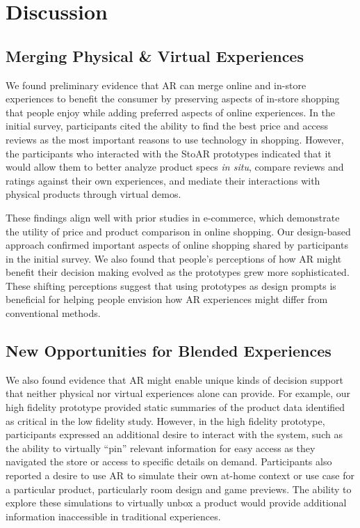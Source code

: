 \section{Discussion}

\subsection{Merging Physical \& Virtual Experiences}
We found preliminary evidence that AR can merge online and in-store experiences to benefit the consumer by preserving aspects of in-store shopping that people enjoy while adding preferred aspects of online experiences.  In the initial survey, participants cited the ability to find the best price and access reviews as the most important reasons to use technology in shopping. However, the participants who interacted with the StoAR prototypes indicated that it would allow them to better analyze product specs \emph{in situ}, compare reviews and ratings against their own experiences, and mediate their interactions with physical products through virtual demos.

These findings align well with prior studies in e-commerce, which demonstrate the utility of price and product comparison in online shopping. Our design-based approach confirmed important aspects of online shopping shared by participants in the initial survey. We also found that people's perceptions of how AR might benefit their decision making evolved as the prototypes grew more sophisticated. These shifting perceptions suggest that using prototypes as design prompts is beneficial for helping people envision how AR experiences might differ from conventional methods. 

\subsection{New Opportunities for Blended Experiences}
We also found evidence that AR might enable unique kinds of decision support that neither physical nor virtual experiences alone can provide. For example, our high fidelity prototype provided static summaries of the product data identified as critical in the low fidelity study. However, in the high fidelity prototype, participants expressed an additional desire to interact with the system, such as the ability to virtually ``pin'' relevant information for easy access as they navigated the store or access to specific details on demand. Participants also reported a desire to use AR to simulate their own at-home context or use case for a particular product, particularly room design and game previews. 
The ability to explore these simulations to virtually unbox a product would provide additional information inaccessible in traditional experiences.

